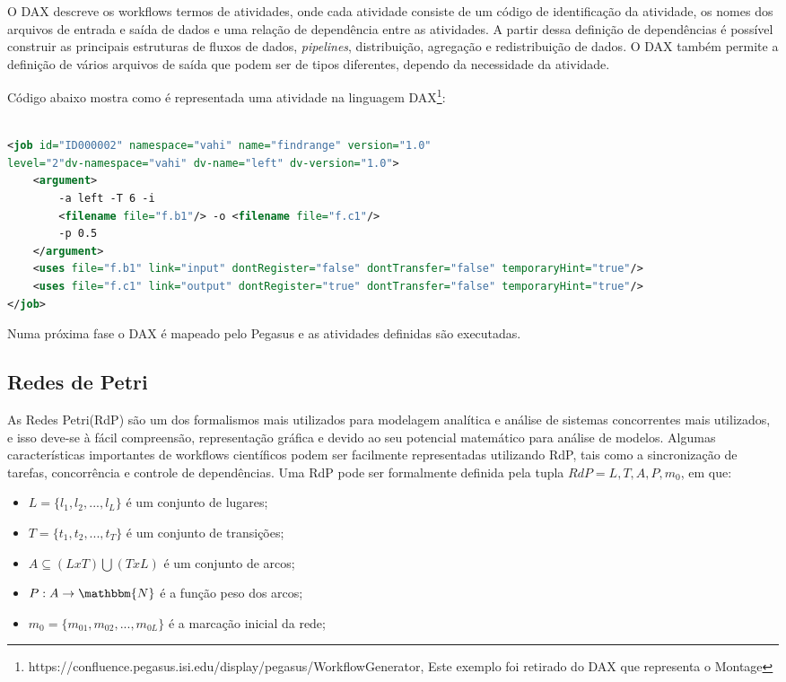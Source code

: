 		O DAX descreve os workflows termos de atividades, onde cada atividade consiste de um código de identificação da atividade, os nomes dos arquivos de entrada e saída de dados e uma relação de dependência entre as atividades. A partir dessa definição de dependências é possível construir as principais estruturas de fluxos de dados, \textit{pipelines}, distribuição, agregação e redistribuição de dados. O DAX também permite a definição de vários arquivos de saída que podem ser de tipos diferentes, dependo da necessidade da atividade\cite{Teixeira2013}. 
		
		 Código abaixo mostra como é representada uma atividade na linguagem DAX\footnote{https://confluence.pegasus.isi.edu/display/pegasus/WorkflowGenerator, Este exemplo foi retirado do DAX que representa o Montage}:
		

\begin{lstlisting}[language=XML, caption=Exemplo de uma atividade DAX]

<job id="ID000002" namespace="vahi" name="findrange" version="1.0" 
level="2"dv-namespace="vahi" dv-name="left"	dv-version="1.0">
	<argument>
		-a left -T 6 -i 
		<filename file="f.b1"/> -o <filename file="f.c1"/>
		-p 0.5
	</argument>
	<uses file="f.b1" link="input" dontRegister="false" dontTransfer="false" temporaryHint="true"/>
	<uses file="f.c1" link="output" dontRegister="true" dontTransfer="false" temporaryHint="true"/>
</job>

\end{lstlisting}

	Numa próxima fase o DAX é mapeado pelo Pegasus e as atividades definidas são executadas.
	
	\subsection{Redes de Petri}
		As Redes Petri(RdP) são um dos formalismos mais utilizados para modelagem analítica e análise de sistemas concorrentes mais utilizados, e isso deve-se à fácil compreensão, representação gráfica e devido ao seu potencial matemático para análise de modelos. Algumas características importantes de workflows científicos podem ser facilmente representadas utilizando RdP, tais como a sincronização de tarefas, concorrência e controle de dependências\cite{Braghetto2011}.
		Uma RdP pode ser formalmente definida pela tupla $RdP={L,T,A,P,m_{0}}$, em que:
		\begin{itemize}
		\item $L=\{l_{1},l_{2},...,l_{L}\}$ é um conjunto de lugares;
		\item $T=\{t_{1},t_{2},...,t_{T}\}$ é um conjunto de transições;
		\item $A\subseteq(L x T)\bigcup (TxL)$ é um conjunto de arcos;
		\item $P: A \rightarrow \mathbbm{N}$ é a função peso dos arcos;
		\item $m_{0}=\{m_{01},m_{02},...,m_{0L}\}$ é a marcação inicial da rede;
		\end{itemize}
		
